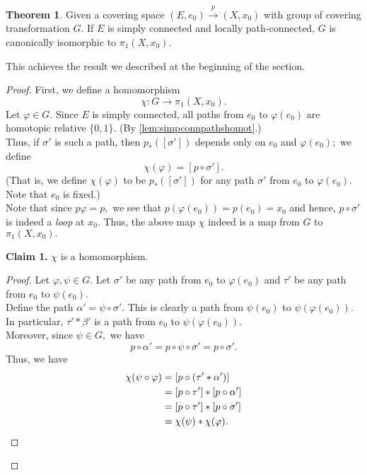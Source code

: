 \documentclass[12pt]{article}
\theoremstyle{definition}
\newtheorem{thm}{Theorem}
\numberwithin{thm}{section}
\newenvironment{blockquote}
{\begin{mdframed}[skipabove=0pt, skipbelow=0pt, innertopmargin=4pt, innerbottommargin=4pt, bottomline=false,topline=false,rightline=false, linewidth=2pt]}
{\end{mdframed}}
\begin{document}
\begin{thm} \label{thm:covtransiso}
	Given a covering space $(E, e_0) \overset{p}{\longrightarrow} (X, x_0)$ with group of covering transformation $G.$ If $E$ is simply connected and locally path-connected, $G$ is canonically isomorphic to $\pi_1(X, x_0).$
\end{thm}
This achieves the result we described at the beginning of the section.
\begin{proof} 
	First, we define a homomorphism 
	\begin{equation*} 
		\chi:G \to \pi_1(X, x_0).
	\end{equation*}
	Let $\varphi \in G.$ Since $E$ is simply connected, all paths from $e_0$ to $\varphi(e_0)$ are homotopic relative $\{0, 1\}.$ (By \cref{lem:simpconnpathshomot}.)\\
	Thus, if $\sigma'$ is such a path, then $p_*([\sigma'])$ depends only on $e_0$ and $\varphi(e_0);$ we define
	\begin{equation*} 
		\chi(\varphi) = [p \circ \sigma'].
	\end{equation*}
	(That is, we define $\chi(\varphi)$ to be $p_*([\sigma'])$ for any path $\sigma'$ from $e_0$ to $\varphi(e_0).$ Note that $e_0$ is fixed.)\\
	Note that since $p\varphi = p,$ we see that $p(\varphi(e_0)) = p(e_0) = x_0$ and hence, $p\circ \sigma'$ is indeed a \emph{loop} at $x_0.$ Thus, the above map $\chi$ indeed is a map from $G$ to $\pi_1(X, x_0).$\\
	
	\begin{blockquote}
		\textbf{Claim 1.} $\chi$ is a homomorphism.
		\begin{proof} 
			Let $\varphi, \psi \in G.$ Let $\sigma'$ be any path from $e_0$ to $\varphi(e_0)$ and $\tau'$ be any path from $e_0$ to $\psi(e_0).$\\
			Define the path $\alpha' = \psi\circ\sigma'.$ This is clearly a path from $\psi(e_0)$ to $\psi(\varphi(e_0)).$ In particular, $\tau'*\beta'$ is a path from $e_0$ to $\psi(\varphi(e_0)).$ \\
			Moreover, since $\psi \in G,$ we have
			\begin{equation*} 
				p\circ\alpha' = p\circ\psi\circ\sigma' = p\circ\sigma'.
			\end{equation*}
			Thus, we have
			\begin{align*} 
				\chi(\psi\circ\varphi) &= [p\circ(\tau'*\alpha')]\\
				&=[p\circ\tau']*[p\circ\alpha']\\
				&=[p\circ\tau']*[p\circ\sigma']\\
				&=\chi(\psi)*\chi(\varphi). \qedhere
			\end{align*}
		\end{proof}
	\end{blockquote}


\end{proof}
\end{document}
